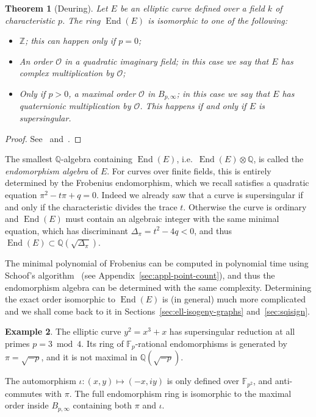 \documentclass[10pt]{article}
\theoremstyle{plain}
\newtheorem{theorem}{Theorem}
\theoremstyle{definition}
\newtheorem{example}[theorem]{Example}
\DeclareMathOperator{\End}{End} %
\def\F{\ensuremath{\mathbb{F}}}
\def\O{\ensuremath{\mathcal{O}}}
\begin{document}
\begin{prposition}
\begin{theorem}[Deuring]
  Let $E$ be an elliptic curve defined over a field $k$ of
  characteristic $p$. %
  The ring $\End(E)$ is isomorphic to one of the following:
  \begin{itemize}
  \item $ℤ$; this can happen only if $p=0$;
  \item An order $\O$ in a quadratic imaginary field; in this case we
    say that $E$ has \emph{complex multiplication} by $\O$;
  \item Only if $p>0$, a maximal order $\O$ in $B_{p,\infty}$; in this
    case we say that $E$ has \emph{quaternionic multiplication} by
    $\O$. %
    This happens if and only if $E$ is supersingular.
  \end{itemize}
\end{theorem}
\begin{proof}
  See~\cite[III, Coro.~9.4]{silverman:elliptic}
  and~\cite{kohel}.
\end{proof}

The smallest $ℚ$-algebra containing $\End(E)$, i.e.\ $\End(E)⊗ℚ$, is
called the \emph{endomorphism algebra} of $E$. %
For curves over finite fields, this is entirely determined by the
Frobenius endomorphism, which we recall satisfies a quadratic equation
$π^2 - tπ + q = 0$. %
Indeed we already saw that a curve is supersingular if and only if the
characteristic divides the trace $t$. %
Otherwise the curve is ordinary and $\End(E)$ must contain an
algebraic integer with the same minimal equation, which has
discriminant $Δ_π=t^2-4q<0$, and thus $\End(E)⊂ℚ(\sqrt{Δ_π})$.

The minimal polynomial of Frobenius can be computed in polynomial time
using Schoof's algorithm~\cite{schoof85} (see
Appendix~\ref{sec:appl-point-count}), and thus the endomorphism
algebra can be determined with the same complexity.
Determining the exact order isomorphic to $\End(E)$ is (in general)
much more complicated and we shall come back to it in
Sections~\ref{sec:ell-isogeny-graphs} and~\ref{sec:sqisign}.

\begin{example}
  The elliptic curve $y^2=x^3+x$ has supersingular reduction at all
  primes $p=3\bmod 4$. %
  Its ring of $\F_p$-rational endomorphisms is generated by
  $π=\sqrt{-p}$, and it is not maximal in $ℚ(\sqrt{-p})$.

  The automorphism $ι:(x,y)↦(-x,iy)$ is only defined over $\F_{p^2}$,
  and anti-commutes with $π$. %
  The full endomorphism ring is isomorphic to the maximal order inside
  $B_{p,∞}$ containing both $π$ and $ι$.
\end{example}


\end{prposition}
\end{document}
